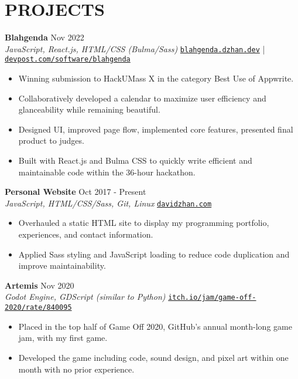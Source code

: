 \documentclass[letterpaper,10pt]{extarticle}
\begin{document}
\section*{PROJECTS}
\noindent
\textbf{Blahgenda} \hfill Nov 2022\\
\textit{JavaScript, React.js, HTML/CSS (Bulma/Sass)} \hfill \texttt{\href{https://blahgenda.dzhan.dev}{blahgenda.dzhan.dev}} | \texttt{\href{https://devpost.com/software/blahgenda}{devpost.com/software/blahgenda}}
\begin{itemize}
    \item Winning submission to HackUMass X in the category Best Use of Appwrite.
    \item Collaboratively developed a calendar to maximize user efficiency and glanceability while remaining beautiful.
    \item Designed UI, improved page flow, implemented core features, presented final product to judges.
    \item Built with React.js and Bulma CSS to quickly write efficient and maintainable code within the 36-hour hackathon.
\end{itemize}

\noindent
\textbf{Personal Website} \hfill Oct 2017 - Present\\
\textit{JavaScript, HTML/CSS/Sass, Git, Linux} \hfill \texttt{\href{https://davidzhan.com}{davidzhan.com}} %
\begin{itemize}
    \item Overhauled a static HTML site to display my programming portfolio, experiences, and contact information.
    \item Applied Sass styling and JavaScript loading to reduce code duplication and improve maintainability.
\end{itemize}


\noindent
\textbf{Artemis} \hfill Nov 2020\\
\textit{Godot Engine, GDScript (similar to Python)} \hfill \texttt{\href{https://itch.io/jam/game-off-2020/rate/840095}{itch.io/jam/game-off-2020/rate/840095}}
\begin{itemize}
    \item Placed in the top half of Game Off 2020, GitHub's annual month-long game jam, with my first game.
    \item Developed the game including code, sound design, and pixel art within one month with no prior experience.
\end{itemize}
\end{document}
